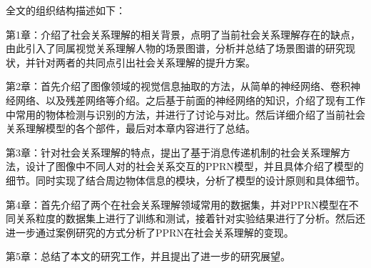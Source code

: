 全文的组织结构描述如下：

第1章：介绍了社会关系理解的相关背景，点明了当前社会关系理解存在的缺点，由此引入了同属视觉关系理解人物的场景图谱，分析并总结了场景图谱的研究现状，并针对两者的共同点引出社会关系理解的提升方案。

第2章：首先介绍了图像领域的视觉信息抽取的方法，从简单的神经网络、卷积神经网络、以及残差网络等介绍。之后基于前面的神经网络的知识，介绍了现有工作中常用的物体检测与识别的方法，并进行了讨论与对比。然后详细介绍了当前社会关系理解模型的各个部件，最后对本章内容进行了总结。

第3章：针对社会关系理解的特点，提出了基于消息传递机制的社会关系理解方法，设计了图像中不同人对的社会关系交互的PPRN模型，并且具体介绍了模型的细节。同时实现了结合周边物体信息的模块，分析了模型的设计原则和具体细节。

第4章：首先介绍了两个在社会关系理解领域常用的数据集，并对PPRN模型在不同关系粒度的数据集上进行了训练和测试，接着针对实验结果进行了分析。然后还进一步通过案例研究的方式分析了PPRN在社会关系理解的变现。

第5章：总结了本文的研究工作，并且提出了进一步的研究展望。



